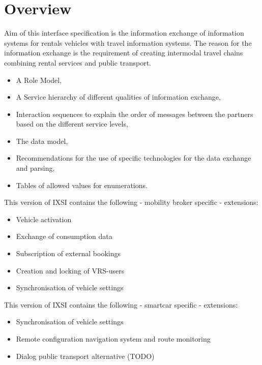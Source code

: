 \chapter{Overview}
\label{cha:Zusammenfassung}

Aim of this interface specification is the information exchange of information systems for rentals vehicles with travel information systems.
The reason for the information exchange is the requirement of creating intermodal travel chains combining rental services and public transport.

\begin{itemize}
\item A Role Model,
\item A Service hierarchy of different qualities of information exchange,
\item Interaction sequences to explain the order of messages between the partners based on the different service levels,
\item The data model,
\item Recommendations for the use of specific technologies for the data exchange and parsing,
\item Tables of allowed values for enumerations.
\end{itemize}
This version of IXSI contains the following - mobility broker specific - extensions:
\begin{itemize}
	\item Vehicle activation 
	\item Exchange of consumption data 
	\item Subscription of external bookings
	\item Creation and locking of VRS-users
	\item Synchronisation of vehicle settings 
\end{itemize}
This version of IXSI contains the following -  smartcar specific - extensions:
\begin{itemize}
	\item Synchronisation of vehicle settings
	\item Remote configuration navigation system and route monitoring
	\item Dialog public transport alternative (TODO)
\end{itemize}
